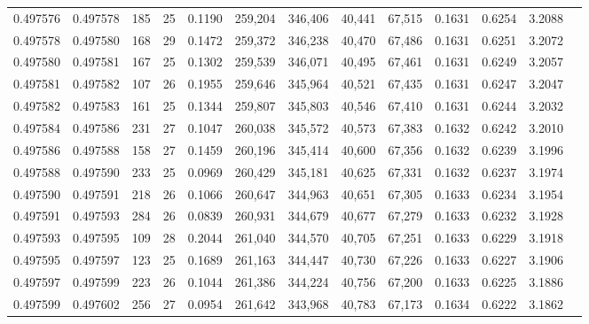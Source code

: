 \begin{tabular}{rrrrrrrrrrrrr}
0.497576 & 0.497578 & 185 &  25 &                                     0.1190 & 259,204 & 346,406 &  40,441 &  67,515 & 0.1631 & 0.6254 & 3.2088 \\
0.497578 & 0.497580 & 168 &  29 &                                     0.1472 & 259,372 & 346,238 &  40,470 &  67,486 & 0.1631 & 0.6251 & 3.2072 \\
0.497580 & 0.497581 & 167 &  25 &                                     0.1302 & 259,539 & 346,071 &  40,495 &  67,461 & 0.1631 & 0.6249 & 3.2057 \\
0.497581 & 0.497582 & 107 &  26 &                                     0.1955 & 259,646 & 345,964 &  40,521 &  67,435 & 0.1631 & 0.6247 & 3.2047 \\
0.497582 & 0.497583 & 161 &  25 &                                     0.1344 & 259,807 & 345,803 &  40,546 &  67,410 & 0.1631 & 0.6244 & 3.2032 \\
0.497584 & 0.497586 & 231 &  27 &                                     0.1047 & 260,038 & 345,572 &  40,573 &  67,383 & 0.1632 & 0.6242 & 3.2010 \\
0.497586 & 0.497588 & 158 &  27 &                                     0.1459 & 260,196 & 345,414 &  40,600 &  67,356 & 0.1632 & 0.6239 & 3.1996 \\
0.497588 & 0.497590 & 233 &  25 &                                     0.0969 & 260,429 & 345,181 &  40,625 &  67,331 & 0.1632 & 0.6237 & 3.1974 \\
0.497590 & 0.497591 & 218 &  26 &                                     0.1066 & 260,647 & 344,963 &  40,651 &  67,305 & 0.1633 & 0.6234 & 3.1954 \\
0.497591 & 0.497593 & 284 &  26 &                                     0.0839 & 260,931 & 344,679 &  40,677 &  67,279 & 0.1633 & 0.6232 & 3.1928 \\
0.497593 & 0.497595 & 109 &  28 &                                     0.2044 & 261,040 & 344,570 &  40,705 &  67,251 & 0.1633 & 0.6229 & 3.1918 \\
0.497595 & 0.497597 & 123 &  25 &                                     0.1689 & 261,163 & 344,447 &  40,730 &  67,226 & 0.1633 & 0.6227 & 3.1906 \\
0.497597 & 0.497599 & 223 &  26 &                                     0.1044 & 261,386 & 344,224 &  40,756 &  67,200 & 0.1633 & 0.6225 & 3.1886 \\
0.497599 & 0.497602 & 256 &  27 &                                     0.0954 & 261,642 & 343,968 &  40,783 &  67,173 & 0.1634 & 0.6222 & 3.1862 \\

\end{tabular}
